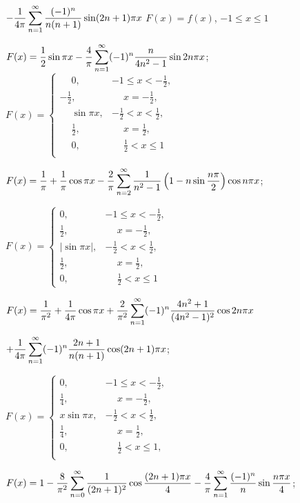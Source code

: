 \;  \qquad \qquad $\displaystyle{-\frac{1}{4\pi}\sum_{n=1}^{\infty}
 \frac{(-1)^{n}}{n(n+1)}\sin(2n+1)\pi x}$   \quad
$F(x)=f(x)$, $-1\le x\le1$

$F(x)=\displaystyle\frac{1}{2}\sin\pi x-\frac{4}{\pi}\sum_{n=1}^{\infty}
(-1)^{n}\frac{n}{4n^{2}-1}\sin2n\pi x$;  \quad
$F(x)=
\left\{\begin{array}{cl}
\phantom{-}0,&-1\le x<-\frac{1}{2},\\
-\frac{1}{2},&\phantom{-}x=-\frac{1}{2},\\
\phantom{-}\sin\pi x,&-\frac{1}{2}<x<\frac{1}{2},\\
\phantom{-}{\frac{1}{2}},&\phantom{-}x=\frac{1}{2},\\
\phantom{-}0,&\phantom{-}{\frac{1}{2}}<x\le1\\
\end{array}\right.$

$F(x)=\displaystyle\frac{1}{\pi}+\frac{1}{\pi}\cos\pi x-\frac{2}{\pi}
\sum_{n=2}^{\infty}\frac{1}{n^{2}-1}\left(1-n\sin\frac{n\pi}{2}\right)
\cos n\pi x$;

\quad \qquad $F(x)=
\left\{\begin{array}{cl}
0,&-1\le x<-\frac{1}{2},\\
\frac{1}{2},&\phantom{-}x=-\frac{1}{2},\\
|\sin\pi x|,&-\frac{1}{2}<x<\frac{1}{2},\\
\frac{1}{2},&\phantom{-}x=\frac{1}{2},\\
0,&\phantom{-}{\frac{1}{2}}<x\le1
\end{array}\right.$

$F(x)=\displaystyle\frac{1}{\pi^{2}}+\frac{1}{4\pi}\cos\pi
x+\frac{2}{\pi^{2}}\sum_{n=1}^{\infty}
(-1)^{n}\frac{4n^{2}+1}{(4n^{2}-1)^{2}}\cos2n\pi x$

\qquad\qquad\;    $\displaystyle{+\frac{1}{4\pi}\sum_{n=1}^{\infty}
(-1)^{n}\frac{2n+1}{n(n+1)}\cos(2n+1)\pi x}$;

\qquad\qquad $F(x)=
\left\{\begin{array}{cl}
0,&-1\le x<-\frac{1}{2},\\
\frac{1}{4},&\phantom{-}x=-\frac{1}{2},\\
x\sin\pi x,&-\frac{1}{2}<x<\frac{1}{2},\\
\frac{1}{4},&\phantom{-}x=\frac{1}{2},\\
0,&\phantom{-}{\frac{1}{2}}<x\le1,\\
\end{array}\right.$

$\displaystyle
F(x)=1-\frac{8}{\pi^{2}}\sum_{n=0}^{\infty}\frac{1}{(2n+1)^{2}}\cos\frac{(2n+1)\pi
x}{4}-\frac{4}{\pi}\sum_{n=1}^{\infty}\frac{(-1)^{n}}{n}\sin\frac{n\pi
x}{4}$;

